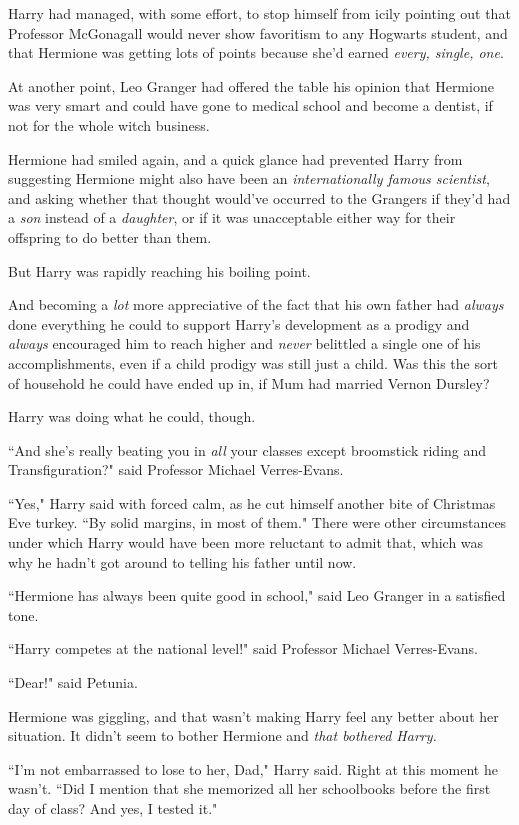 Harry had managed, with some effort, to stop himself from icily pointing out that Professor McGonagall would never show favoritism to any Hogwarts student, and that Hermione was getting lots of points because she'd earned \emph{every, single, one}.

At another point, Leo Granger had offered the table his opinion that Hermione was very smart and could have gone to medical school and become a dentist, if not for the whole witch business.

Hermione had smiled again, and a quick glance had prevented Harry from suggesting Hermione might also have been an \emph{internationally famous scientist}, and asking whether that thought would've occurred to the Grangers if they'd had a \emph{son} instead of a \emph{daughter}, or if it was unacceptable either way for their offspring to do better than them.

But Harry was rapidly reaching his boiling point.

And becoming a \emph{lot} more appreciative of the fact that his own father had \emph{always} done everything he could to support Harry's development as a prodigy and \emph{always} encouraged him to reach higher and \emph{never} belittled a single one of his accomplishments, even if a child prodigy was still just a child. Was this the sort of household he could have ended up in, if Mum had married Vernon Dursley?

Harry was doing what he could, though.

``And she's really beating you in \emph{all} your classes except broomstick riding and Transfiguration?" said Professor Michael Verres-Evans.

``Yes," Harry said with forced calm, as he cut himself another bite of Christmas Eve turkey. ``By solid margins, in most of them." There were other circumstances under which Harry would have been more reluctant to admit that, which was why he hadn't got around to telling his father until now.

``Hermione has always been quite good in school," said Leo Granger in a satisfied tone.

``Harry competes at the national level!" said Professor Michael Verres-Evans.

``Dear!" said Petunia.

Hermione was giggling, and that wasn't making Harry feel any better about her situation. It didn't seem to bother Hermione and \emph{that bothered Harry.}

``I'm not embarrassed to lose to her, Dad," Harry said. Right at this moment he wasn't. ``Did I mention that she memorized all her schoolbooks before the first day of class? And yes, I tested it."

